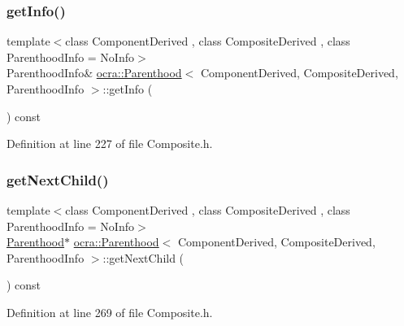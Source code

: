 \subsubsection{\texorpdfstring{get\+Info()}{getInfo()}}
{\footnotesize\ttfamily template$<$class Component\+Derived , class Composite\+Derived , class Parenthood\+Info  = No\+Info$>$ \\
Parenthood\+Info\& \hyperlink{classocra_1_1Parenthood}{ocra\+::\+Parenthood}$<$ Component\+Derived, Composite\+Derived, Parenthood\+Info $>$\+::get\+Info (\begin{DoxyParamCaption}{ }\end{DoxyParamCaption}) const\hspace{0.3cm}{\ttfamily [inline]}}



Definition at line 227 of file Composite.\+h.

\hypertarget{classocra_1_1Parenthood_a3a39b83562da1e72067ae98934c4d119}{}\label{classocra_1_1Parenthood_a3a39b83562da1e72067ae98934c4d119} 
\subsubsection{\texorpdfstring{get\+Next\+Child()}{getNextChild()}}
{\footnotesize\ttfamily template$<$class Component\+Derived , class Composite\+Derived , class Parenthood\+Info  = No\+Info$>$ \\
\hyperlink{classocra_1_1Parenthood}{Parenthood}$\ast$ \hyperlink{classocra_1_1Parenthood}{ocra\+::\+Parenthood}$<$ Component\+Derived, Composite\+Derived, Parenthood\+Info $>$\+::get\+Next\+Child (\begin{DoxyParamCaption}{ }\end{DoxyParamCaption}) const\hspace{0.3cm}{\ttfamily [inline]}}



Definition at line 269 of file Composite.\+h.

\hypertarget{classocra_1_1Parenthood_a550aeaefe0b5901a98e3fb7ca4d4eb9c}{}\label{classocra_1_1Parenthood_a550aeaefe0b5901a98e3fb7ca4d4eb9c} 
